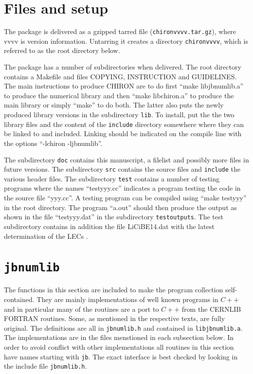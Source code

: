 \documentclass[12pt,a4paper]{article}
\begin{document}
\section{Files and setup}
\label{setup}

The package is delivered as a gzipped tarred file (\texttt{chironvvvv.tar.gz}),
where
vvvv is version information. Untarring it creates a directory
\texttt{chironvvvv}, which is referred to as the root directory below.
  
The package has a number of subdirectories when delivered.
The root directory contains a Makefile and files
COPYING, INSTRUCTION and GUIDELINES. The main instructions to
produce {\textsc CHIRON} are to do first ``make libjbnumlib.a'' to
produce the numerical library and then ``make libchiron.a''
to produce the main library or simply ``make'' to do both.
The latter also puts the newly produced library versions in the subdirectory
\texttt{lib}.
To install, put the the two library files
and the content of the \texttt{include} directory somewhere where they
can be linked to and included. Linking should be indicated on the compile line
with the options ``-lchiron -ljbnumlib''.

The subdirectory \texttt{doc} contains this manuscript, a filelist and
possibly more files in future versions. The subdirectory \texttt{src}
contains the source files
and \texttt{include} the various header files. The subdirectory \texttt{test}
contains a number of testing programs where the names ``testyyy.cc'' indicates
a program testing the code in the source file ``yyy.cc''. A testing program
can be compiled using ``make testyyy'' in the root directory. The program
``a.out'' should then produce the output as shown in the file ``testyyy.dat''
in the subdirectory \texttt{testoutputs}.
The test subdirectory contains in addition the file LiCiBE14.dat
with the latest determination of the LECs \cite{Bijnens:2014lea}.

\section{\texttt{jbnumlib}}
\label{jbnumlib}

The functions in this section are included to make the program collection
self-contained. They are mainly implementations of well known programs in $C++$
and in particular many of the routines are a port to $C++$
from the {\textsc CERNLIB} \cite{cernlib} {\textsc FORTRAN} routines.
Some, as mentioned in the respective texts, are fully original.
The definitions are all in \texttt{jbnumlib.h} and contained in
\texttt{libjbnumlib.a}. The implementations are in the files
menstioned in each subsection below.
In order to avoid conflict with other implementations all routines
in this section have names starting with \texttt{jb}.
The exact interface is best checked by looking in the include file
\texttt{jbnumlib.h}.
\end{document}

